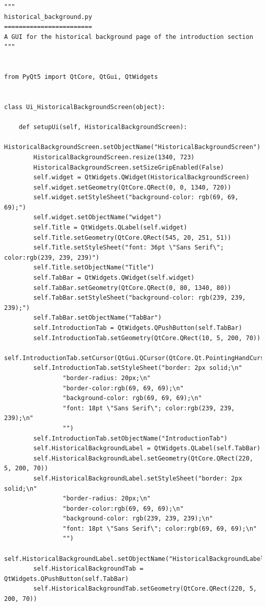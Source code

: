 \documentclass{article}
\begin{document}
\begin{lstlisting}
"""
historical_background.py
========================
A GUI for the historical background page of the introduction section
"""


from PyQt5 import QtCore, QtGui, QtWidgets


class Ui_HistoricalBackgroundScreen(object):

    def setupUi(self, HistoricalBackgroundScreen):
        HistoricalBackgroundScreen.setObjectName("HistoricalBackgroundScreen")
        HistoricalBackgroundScreen.resize(1340, 723)
        HistoricalBackgroundScreen.setSizeGripEnabled(False)
        self.widget = QtWidgets.QWidget(HistoricalBackgroundScreen)
        self.widget.setGeometry(QtCore.QRect(0, 0, 1340, 720))
        self.widget.setStyleSheet("background-color: rgb(69, 69, 69);")
        self.widget.setObjectName("widget")
        self.Title = QtWidgets.QLabel(self.widget)
        self.Title.setGeometry(QtCore.QRect(545, 20, 251, 51))
        self.Title.setStyleSheet("font: 36pt \"Sans Serif\"; color:rgb(239, 239, 239)")
        self.Title.setObjectName("Title")
        self.TabBar = QtWidgets.QWidget(self.widget)
        self.TabBar.setGeometry(QtCore.QRect(0, 80, 1340, 80))
        self.TabBar.setStyleSheet("background-color: rgb(239, 239, 239);")
        self.TabBar.setObjectName("TabBar")
        self.IntroductionTab = QtWidgets.QPushButton(self.TabBar)
        self.IntroductionTab.setGeometry(QtCore.QRect(10, 5, 200, 70))
        self.IntroductionTab.setCursor(QtGui.QCursor(QtCore.Qt.PointingHandCursor))
        self.IntroductionTab.setStyleSheet("border: 2px solid;\n"
                "border-radius: 20px;\n"
                "border-color:rgb(69, 69, 69);\n"
                "background-color: rgb(69, 69, 69);\n"
                "font: 18pt \"Sans Serif\"; color:rgb(239, 239, 239);\n"
                "")
        self.IntroductionTab.setObjectName("IntroductionTab")
        self.HistoricalBackgroundLabel = QtWidgets.QLabel(self.TabBar)
        self.HistoricalBackgroundLabel.setGeometry(QtCore.QRect(220, 5, 200, 70))
        self.HistoricalBackgroundLabel.setStyleSheet("border: 2px solid;\n"
                "border-radius: 20px;\n"
                "border-color:rgb(69, 69, 69);\n"
                "background-color: rgb(239, 239, 239);\n"
                "font: 18pt \"Sans Serif\"; color:rgb(69, 69, 69);\n"
                "")
        self.HistoricalBackgroundLabel.setObjectName("HistoricalBackgroundLabel")
        self.HistoricalBackgroundTab = QtWidgets.QPushButton(self.TabBar)
        self.HistoricalBackgroundTab.setGeometry(QtCore.QRect(220, 5, 200, 70))

\end{lstlisting}
\end{document}
